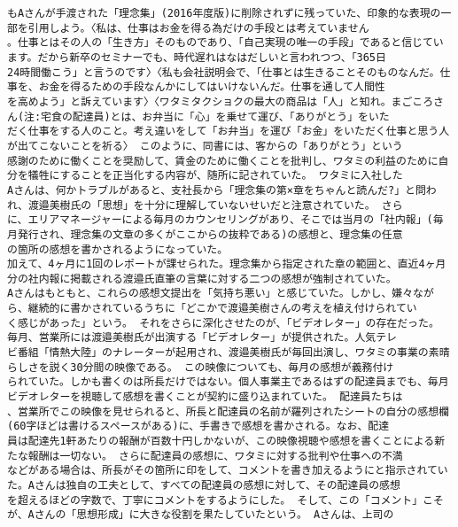 \documentclass[11pt]{article}
\begin{document}
\begin{Verbatim}[commandchars=\\\{\}]
もAさんが手渡された「理念集」(2016年度版)に削除されずに残っていた、印象的な表現の一部を引用しよう。〈私は、仕事はお金を得る為だけの手段とは考えていません
。仕事とはその人の「生き方」そのものであり、「自己実現の唯一の手段」であると信じています。だから新卒のセミナーでも、時代遅れはなはだしいと言われつつ、「365日
24時間働こう」と言うのです〉〈私も会社説明会で、「仕事とは生きることそのものなんだ。仕事を、お金を得るための手段なんかにしてはいけないんだ。仕事を通して人間性
を高めよう」と訴えています〉〈ワタミタクショクの最大の商品は「人」と知れ。まごころさん(注:宅食の配達員)とは、お弁当に「心」を乗せて運び、「ありがとう」をいた
だく仕事をする人のこと。考え違いをして「お弁当」を運び「お金」をいただく仕事と思う人が出てこないことを祈る〉 このように、同書には、客からの「ありがとう」という
感謝のために働くことを奨励して、賃金のために働くことを批判し、ワタミの利益のために自分を犠牲にすることを正当化する内容が、随所に記されていた。 ワタミに入社した
Aさんは、何かトラブルがあると、支社長から「理念集の第×章をちゃんと読んだ?」と問われ、渡邉美樹氏の「思想」を十分に理解していないせいだと注意されていた。 さら
に、エリアマネージャーによる毎月のカウンセリングがあり、そこでは当月の「社内報」(毎月発行され、理念集の文章の多くがここからの抜粋である)の感想と、理念集の任意
の箇所の感想を書かされるようになっていた。
加えて、4ヶ月に1回のレポートが課せられた。理念集から指定された章の範囲と、直近4ヶ月分の社内報に掲載される渡邉氏直筆の言葉に対する二つの感想が強制されていた。
Aさんはもともと、これらの感想文提出を「気持ち悪い」と感じていた。しかし、嫌々ながら、継続的に書かされているうちに「どこかで渡邉美樹さんの考えを植え付けられてい
く感じがあった」という。 それをさらに深化させたのが、「ビデオレター」の存在だった。 毎月、営業所には渡邉美樹氏が出演する「ビデオレター」が提供された。人気テレ
ビ番組「情熱大陸」のナレーターが起用され、渡邉美樹氏が毎回出演し、ワタミの事業の素晴らしさを説く30分間の映像である。 この映像についても、毎月の感想が義務付け
られていた。しかも書くのは所長だけではない。個人事業主であるはずの配達員までも、毎月ビデオレターを視聴して感想を書くことが契約に盛り込まれていた。 配達員たちは
、営業所でこの映像を見せられると、所長と配達員の名前が羅列されたシートの自分の感想欄(60字ほどは書けるスペースがある)に、手書きで感想を書かされる。なお、配達
員は配達先1軒あたりの報酬が百数十円しかないが、この映像視聴や感想を書くことによる新たな報酬は一切ない。 さらに配達員の感想に、ワタミに対する批判や仕事への不満
などがある場合は、所長がその箇所に印をして、コメントを書き加えるようにと指示されていた。Aさんは独自の工夫として、すべての配達員の感想に対して、その配達員の感想
を超えるほどの字数で、丁寧にコメントをするようにした。 そして、この「コメント」こそが、Aさんの「思想形成」に大きな役割を果たしていたという。 Aさんは、上司の

\end{Verbatim}
\end{document}
